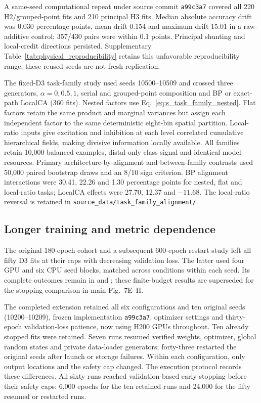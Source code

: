 A same-seed computational repeat under source commit \texttt{a99c3a7} covered all 220 H2/grouped-point fits and 210 principal H3 fits. Median absolute accuracy drift was 0.030 percentage points, mean drift 0.154 and maximum drift 15.01 in a raw-additive control; 357/430 pairs were within 0.1 points. Principal shunting and local-credit directions persisted. Supplementary Table~\ref{tab:physical_reproducibility} retains this unfavorable reproducibility range; these reused seeds are not fresh replication.

The fixed-D3 task-family study used seeds 10500--10509 and crossed three generators, $\alpha=0,0.5,1$, serial and grouped-point composition and BP or exact-path LocalCA (360 fits). Nested factors use Eq.~\ref{eq:s_task_family_nested}. Flat factors retain the same product and marginal variances but assign each independent factor to the same deterministic eight-bin spatial partition. Local-ratio inputs give excitation and inhibition at each level correlated cumulative hierarchical fields, making divisive information locally available. All families retain 10,000 balanced examples, distal-only class signal and identical model resources. Primary architecture-by-alignment and between-family contrasts used 50,000 paired bootstrap draws and an 8/10 sign criterion. BP alignment interactions were 30.41, 22.26 and 1.30 percentage points for nested, flat and local-ratio tasks; LocalCA effects were 27.70, 12.37 and $-11.68$. The local-ratio reversal is retained in \texttt{source\_data/task\_family\_alignment/}.

\subsection{Longer training and metric dependence}
The original 180-epoch cohort and a subsequent 600-epoch restart study left all fifty D3 fits at their caps with decreasing validation loss. The latter used four GPU and six CPU seed blocks, matched across conditions within each seed. Its complete outcomes remain in  and ; these finite-budget results are superseded for the stopping comparison in main Fig.~7E--H.

The completed extension retained all six configurations and ten original seeds (10200--10209), frozen implementation \texttt{a99c3a7}, optimizer settings and thirty-epoch validation-loss patience, now using H200 GPUs throughout. Ten already stopped fits were retained. Seven runs resumed verified weights, optimizer, global random states and private data-loader generators; forty-three restarted the original seeds after launch or storage failures. Within each configuration, only output locations and the safety cap changed. The execution protocol records these differences. All sixty runs reached validation-based early stopping before their safety caps: 6,000 epochs for the ten retained runs and 24,000 for the fifty resumed or restarted runs.

